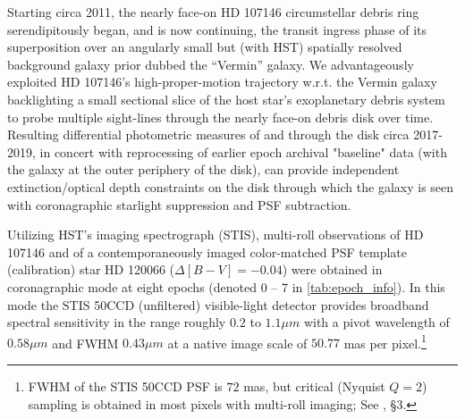 \documentclass{aa}
\begin{document}
Starting circa 2011, the nearly face-on HD 107146 circumstellar debris ring serendipitously began, and is now continuing, the transit ingress phase of its superposition over an angularly small but (with HST) spatially resolved background galaxy prior dubbed the “Vermin” galaxy. We advantageously exploited HD 107146’s high-proper-motion trajectory w.r.t. the Vermin galaxy backlighting a small sectional slice of the host star’s exoplanetary debris system to probe multiple sight-lines through the nearly face-on debris disk over time. Resulting differential photometric measures of and through the disk circa 2017-2019, in concert with reprocessing of earlier epoch archival "baseline" data (with the galaxy at the outer periphery of the disk), can provide independent extinction/optical depth constraints on the disk through which the galaxy is seen with coronagraphic starlight suppression and PSF subtraction.

Utilizing HST’s imaging spectrograph (STIS), multi-roll observations of HD 107146 and of a contemporaneously imaged color-matched PSF template (calibration) star HD 120066 ($\Delta[B-V]= -0.04$) were obtained in coronagraphic mode at eight epochs (denoted 0 – 7 in \autoref{tab:epoch_info}). In this mode the STIS 50CCD (unfiltered) visible-light detector provides broadband spectral sensitivity in the range roughly $0.2$ to $1.1\mu m$  with a pivot wavelength of $0.58\mu m$ and FWHM $0.43 \mu m$ at a native image scale of $50.77$ mas per pixel.\footnote{FWHM of the STIS 50CCD PSF is $72$ mas, but critical (Nyquist $Q=2$) sampling is obtained in most pixels with multi-roll imaging; See \cite{schneider2018hr}, §3. }
\end{document}
